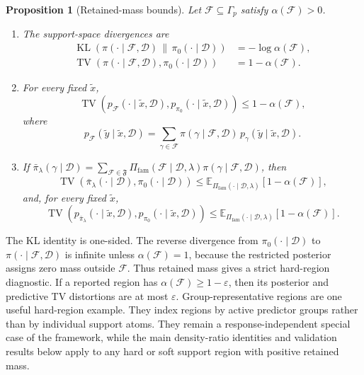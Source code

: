 \documentclass[twoside,11pt]{article}
\newtheorem{proposition}{Proposition}
\newcommand{\D}{\mathcal{D}}
\newcommand{\F}{\mathcal{F}}
\newcommand{\Fp}{\mathfrak{F}}
\newcommand{\E}{\mathbb{E}}
\newcommand{\TV}{\operatorname{TV}}
\newcommand{\KL}{\operatorname{KL}}
\begin{document}
\begin{proposition}[Retained-mass bounds]
\label{prop:bridge}
Let $\F \subseteq \Gamma_p$ satisfy $\alpha(\F)>0$.
\begin{enumerate}[label=(\roman*), leftmargin=1.8em]
\item The support-space divergences are
\begin{align}
\KL\!\left(\pi(\cdot \mid \F,\D)\,\|\,\pi_0(\cdot \mid \D)\right)&=-\log \alpha(\F), \label{eq:KLbridge} \\
\TV\!\left(\pi(\cdot \mid \F,\D),\pi_0(\cdot \mid \D)\right)&=1-\alpha(\F). \label{eq:TVbridge}
\end{align}
\item For every fixed $\tilde x$,
\begin{equation}
\TV\!\left(p_{\F}(\cdot \mid \tilde x,\D), p_{\pi_0}(\cdot \mid \tilde x,\D)\right) \le 1-\alpha(\F), \label{eq:predTVbridge}
\end{equation}
where
\[
p_\F(\tilde y \mid \tilde x,\D) = \sum_{\gamma \in \F} \pi(\gamma \mid \F,\D)\, p_\gamma(\tilde y \mid \tilde x,\D).
\]
\item If $\bar\pi_\lambda(\gamma \mid \D)=\sum_{\F \in \Fp}\Pi_{\mathrm{fam}}(\F \mid \D,\lambda)\pi(\gamma \mid \F,\D)$, then
\begin{equation}
\TV\!\left(\bar\pi_\lambda(\cdot \mid \D), \pi_0(\cdot \mid \D)\right) \le \E_{\Pi_{\mathrm{fam}}(\cdot \mid \D,\lambda)} \!\left[1-\alpha(\F)\right], \label{eq:avgTV}
\end{equation}
and, for every fixed $\tilde x$,
\begin{equation}
\TV\!\left(p_{\bar\pi_\lambda}(\cdot \mid \tilde x,\D), p_{\pi_0}(\cdot \mid \tilde x,\D)\right) \le \E_{\Pi_{\mathrm{fam}}(\cdot \mid \D,\lambda)} \!\left[1-\alpha(\F)\right]. \label{eq:avgpredTV}
\end{equation}
\end{enumerate}
\end{proposition}

The KL identity is one-sided. The reverse divergence from $\pi_0(\cdot\mid\D)$ to $\pi(\cdot\mid\F,\D)$ is infinite unless $\alpha(\F)=1$, because the restricted posterior assigns zero mass outside $\F$. Thus retained mass gives a strict hard-region diagnostic. If a reported region has $\alpha(\F)\ge1-\varepsilon$, then its posterior and predictive TV distortions are at most \(\varepsilon\). Group-representative regions are one useful hard-region example. They index regions by active predictor groups rather than by individual support atoms. They remain a response-independent special case of the framework, while the main density-ratio identities and validation results below apply to any hard or soft support region with positive retained mass.
\end{document}
